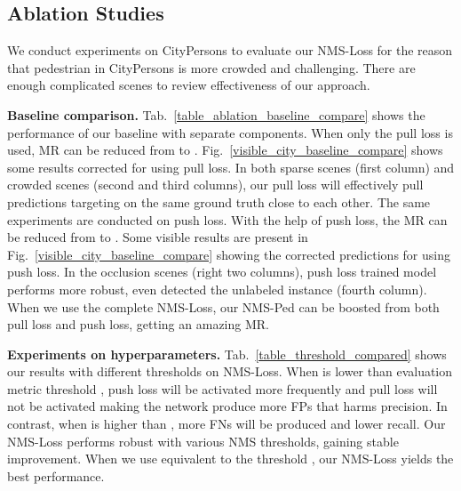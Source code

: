 \documentclass[sigconf]{acmart}
\begin{document}
\begin{table}[t]
\setlength{\abovecaptionskip}{2mm}
\setlength{\belowcaptionskip}{2mm}
\caption{\textbf{Comparison on different thresholds  of NMS-Loss on CityPersons}.}
\vspace{-1mm}
\begin{center}
\end{center}
\vspace{-2mm}
\label{table_threshold_compared}
\end{table}

\subsection{Ablation Studies}
We conduct experiments on CityPersons to evaluate our NMS-Loss for the reason that pedestrian in CityPersons is more crowded and challenging. There are enough complicated scenes to review effectiveness of our approach.

\noindent
\textbf{Baseline comparison.}
Tab.~\ref{table_ablation_baseline_compare} shows the performance of our baseline with separate components. When only the pull loss is used, MR can be reduced from  to . Fig.~\ref{visible_city_baseline_compare} shows some results corrected for using pull loss. In both sparse scenes (first column) and crowded scenes (second and third columns), our pull loss will effectively pull predictions targeting on the same ground truth close to each other. The same experiments are conducted on push loss. With the help of push loss, the MR can be reduced from  to . Some visible results are present in Fig.~\ref{visible_city_baseline_compare} showing the corrected predictions for using push loss. In the occlusion scenes (right two columns), push loss trained model performs more robust, even detected the unlabeled instance (fourth column). When we use the complete NMS-Loss, our NMS-Ped can be boosted from both pull loss and push loss, getting an amazing  MR.

\noindent
\textbf{Experiments on hyperparameters.}
Tab.~\ref{table_threshold_compared} shows our results with different thresholds  on NMS-Loss.
When  is lower than evaluation metric threshold , push loss will be activated more frequently and pull loss will not be activated  making the network produce more FPs that harms precision.
In contrast, when  is higher than , more FNs will be produced and lower recall. Our NMS-Loss performs robust with various NMS thresholds, gaining stable improvement.
When we use  equivalent to the threshold , our NMS-Loss yields the best performance.
\end{document}
